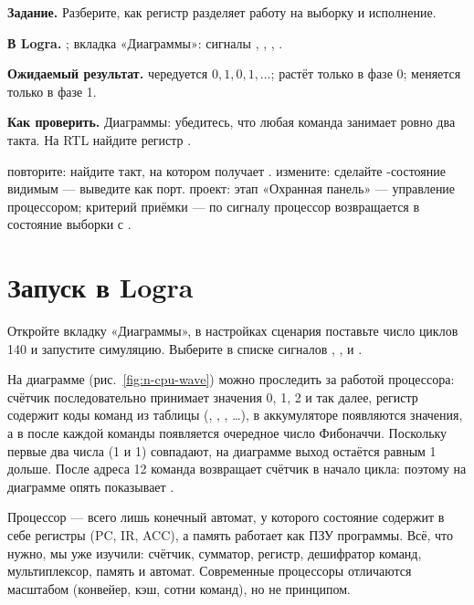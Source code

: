 \begin{diybox}
\textbf{Задание.} Разберите, как регистр  разделяет работу на выборку и исполнение.

\textbf{В Logra.} ; вкладка «Диаграммы»: сигналы , , , .

\textbf{Ожидаемый результат.}  чередуется $0,1,0,1,\ldots$;  растёт только в фазе 0;  меняется только в фазе 1.

\textbf{Как проверить.} Диаграммы: убедитесь, что любая команда занимает ровно два такта. На RTL найдите регистр .

 повторите: найдите такт, на котором  получает .  измените: сделайте -состояние видимым --- выведите  как порт.  проект: этап «Охранная панель» --- управление процессором; критерий приёмки --- по сигналу  процессор возвращается в состояние выборки с .
\end{diybox}

\section{Запуск в Logra}

Откройте вкладку «Диаграммы», в настройках сценария поставьте число циклов
140 и запустите симуляцию. Выберите в списке сигналов , ,
 и .


На диаграмме (рис.~\ref{fig:n-cpu-wave}) можно проследить за работой процессора:
счётчик  последовательно принимает значения 0, 1, 2 и так далее,
регистр  содержит коды команд из таблицы (, ,
, \ldots), в аккумуляторе  появляются значения, а в
 после каждой команды  появляется очередное число
Фибоначчи. Поскольку первые два числа (1 и 1) совпадают, на диаграмме выход
остаётся равным 1 дольше. После адреса 12 команда  возвращает
счётчик в начало цикла: поэтому  на диаграмме опять показывает
.

\begin{ideabox}
Процессор --- всего лишь конечный автомат, у которого состояние содержит
в себе регистры (PC, IR, ACC), а память работает как ПЗУ программы. Всё,
что нужно, мы уже изучили: счётчик, сумматор, регистр, дешифратор команд,
мультиплексор, память и автомат. Современные процессоры отличаются
масштабом (конвейер, кэш, сотни команд), но не принципом.
\end{ideabox}

